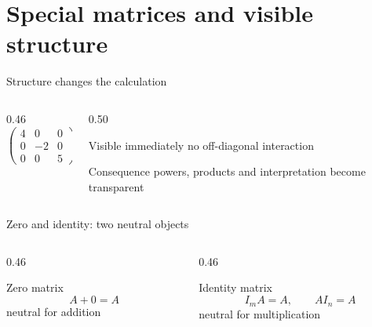 \def\sectiontag{Patterns are mathematical information, not decoration}
\section{Special matrices and visible structure}

\begin{frame}{Structure changes the calculation}
  \begin{columns}[T,onlytextwidth]
    \begin{column}{0.46\textwidth}
      \[
      \begin{pmatrix}
      4&0&0\\
      0&-2&0\\
      0&0&5
      \end{pmatrix}
      \]
    \end{column}
    \begin{column}{0.50\textwidth}
      \begin{block}{Visible immediately}
        no off-diagonal interaction
      \end{block}
      \begin{exampleblock}{Consequence}
        powers, products and interpretation become transparent
      \end{exampleblock}
    \end{column}
  \end{columns}

  \vspace{0.5cm}
\end{frame}

\begin{frame}{Zero and identity: two neutral objects}
  \begin{columns}[T,onlytextwidth]
    \begin{column}{0.46\textwidth}
      \begin{block}{Zero matrix}
        \[
        A+0=A
        \]
        neutral for addition
      \end{block}
    \end{column}
    \begin{column}{0.46\textwidth}
      \begin{exampleblock}{Identity matrix}
        \[
        I_mA=A,\qquad AI_n=A
        \]
        neutral for multiplication
      \end{exampleblock}
    \end{column}
  \end{columns}
\end{frame}

